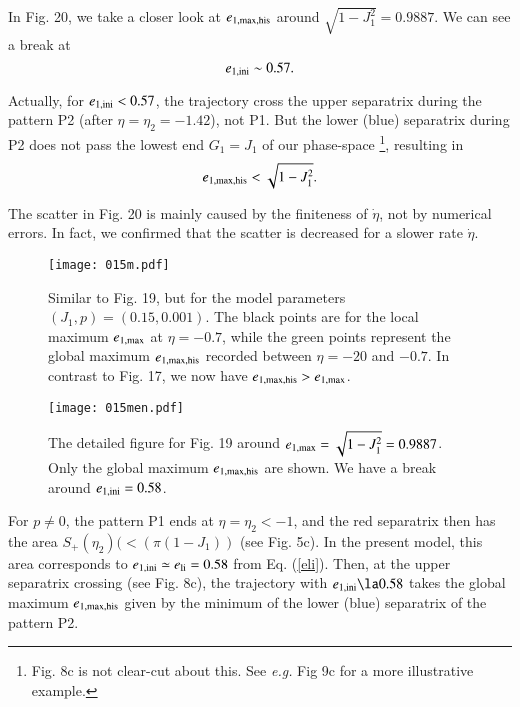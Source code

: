 \documentclass[useAMS,usenatbib,twocolumn]{mn2e}
\newcommand{\beq}{\begin{equation}}
\newcommand{\eeq}{\end{equation}}
\newcommand{\lsim}{\la}
\begin{document}
In Fig. 20, we take a closer look at $e_{\rm 1,max,his}$ around $\sqrt{1-J_1^2}=0.9887$. We can see a break at 
\beq
e_{\rm 1,ini}\sim 0.57.
\eeq

Actually, for $e_{\rm 1,ini}< 0.57$, the trajectory cross the upper separatrix during the pattern P2 (after $\eta=\eta_2=-1.42$), not P1.  But the lower (blue) separatrix during P2 does not pass the lowest end $G_1=J_1$ of our phase-space \footnote{Fig. 8c is not clear-cut about this. See {\it e.g.} Fig 9c for a more illustrative example.}, resulting in 
\beq
e_{\rm 1,max,his}<\sqrt{1-J_1^2}.
\eeq

 The scatter in Fig. 20 is mainly caused by the finiteness of $\dot \eta$, not by numerical errors.  In fact,  we confirmed that  the scatter is decreased for a slower rate $\dot \eta$.  


\begin{figure}
\begin{center}
\texttt{[image: 015m.pdf]}
\caption{Similar to Fig. 19, but for the model parameters  $(J_1,p)=(0.15,0.001)$.  The black points are for the local maximum $e_{\rm 1,max}$ at $\eta=-0.7$, while the green points represent the global maximum $e_{\rm 1,max,his}$ recorded between $\eta=-20$ and $-0.7$.  In contrast to Fig. 17, we now have $e_{\rm 1,max,his}>e_{\rm 1,max}$.}
\label{fig:19}
\end{center}
\end{figure}



\begin{figure}
\begin{center}
\texttt{[image: 015men.pdf]}
\caption{The detailed  figure for Fig. 19 around $e_{\rm 1,max}=\sqrt{1-J_1^2}=0.9887$. Only the global maximum $e_{\rm 1,max,his}$ are shown. We have a break around $e_{\rm 1,ini}=0.58$.}
\label{fig:20}
\end{center}
\end{figure}






For $p\ne 0$, the pattern P1 ends at $\eta=\eta_2<-1$, and the red separatrix then has the area $S_+(\eta_2)(<(\pi (1-J_1))$  (see Fig. 5c). In the present model, this area corresponds to $e_{\rm 1,ini}\simeq e_{\rm li}=0.58$ from Eq. (\ref{eli}).  
Then, at the upper separatrix crossing (see Fig. 8c),  the trajectory with $e_{\rm 1,ini}\lsim 0.58$ takes the global maximum $e_{\rm1,max,his}$ given by the minimum of the lower (blue) separatrix of the pattern P2.
\end{document}
